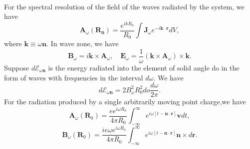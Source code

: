 \\
For the spectral resolution of the field of the waves radiated by the system, we have
\[\bm{A}_{\omega}(\bm{R_0}) =  \frac{e^{ikR_0}}{R_0} \int \bm{J}_{\omega} e^{-i\bm{k}\cdot\bm{r}} dV,\]
where $\bm{k} \equiv \omega\bm{n}$.
In wave zone, we have
\[\bm{B}_{\omega} = i\bm{k} \times \bm{A}_{\omega} , \quad \bm{E}_{\omega} = \frac{1}{\omega} \left( \bm{k} \times \bm{A}_{\omega}\right) \times \bm{k}.\]
Suppose $d\mathcal{E}_{\omega\bm{n}}$ is the energy radiated into the element of solid angle do in the form of waves with frequencies in the interval $d\omega$. We have
\[d\mathcal{E}_{\omega\bm{n}} = 2B_{\omega}^2 R_0^2 do \frac{d\omega}{2\pi}.\]
For the radiation produced by a single arbitrarily moving point charge,we have
\[\bm{A}_{\omega}(\bm{R}_0) = \frac{e e^{i\omega
R_0}}{4\pi R_0}  \int_{-\infty}^{\infty} e^{i\omega[
t-\bm{n}\cdot\bm{r}]} \bm{v} dt,\]
\[\bm{B}_{\omega}(\bm{R}_0) = \frac{ie\omega e^{i\omega
R_0}}{4\pi R_0}  \int_{-\infty}^{\infty} e^{i\omega[
t-\bm{n}\cdot\bm{r}]}  \bm{n} \times d\bm{r}.\]

